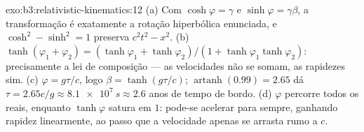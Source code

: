 \begin{solution}{exo:b3:relativistic-kinematics:12}
(a) Com $\cosh\varphi = \gamma$ e $\sinh\varphi = \gamma\beta$, a
transformação é exatamente a rotação hiperbólica enunciada, e
$\cosh^2 - \sinh^2 = 1$ preserva $c^2t^2 - x^2$. (b)
$\tanh(\varphi_1 + \varphi_2) = (\tanh\varphi_1 + \tanh\varphi_2)/(1 +
\tanh\varphi_1\tanh\varphi_2)$: precisamente a lei de composição ---
as velocidades não se somam, as rapidezes sim. (c) $\varphi = g\tau/c$,
logo $\beta = \tanh(g\tau/c)$; $\operatorname{artanh}(0.99) = 2.65$ dá
$\tau = 2.65c/g \approx \qty{8.1e7}{s} \approx 2.6$ anos de tempo de
bordo. (d) $\varphi$ percorre todos os reais, enquanto $\tanh\varphi$
satura em $1$: pode-se acelerar para sempre, ganhando rapidez
linearmente, ao passo que a velocidade apenas se arrasta rumo a $c$.
\end{solution}


